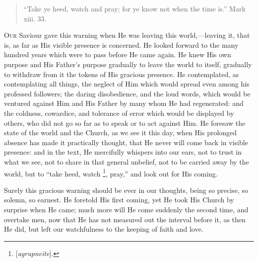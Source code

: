 
\begin{quote}

``Take ye heed, watch and pray; for ye know not when the time
is.'' Mark xiii. 33.

\end{quote}

O\textsc{ur} Saviour gave this warning when He was leaving this world,—leaving
it, that is, as far as His visible presence is concerned. He looked
forward to the many hundred years which were to pass before He came
again. He knew His own purpose and His Father's purpose gradually to
leave the world to itself, gradually to withdraw from it the tokens of
His gracious presence. He contemplated, as contemplating all things,
the neglect of Him which would spread even among his professed
followers; the daring disobedience, and the loud words, which would be
ventured against Him and His Father by many whom He had regenerated:
and the coldness, cowardice, and tolerance of error which would be
displayed by others, who did not go so far as to speak or to act
against Him. He foresaw the state of the world and the Church, as we
see it this day, when His prolonged absence has made it practically
thought, that He never will come back in visible presence: and in the
text, He mercifully whispers into our ears, not to trust in what we
see, not to share in that general unbelief, not to be carried away by
the world, but to ``take heed, watch \footnote{[\emph{agrupneite}].},
pray,'' and look out for His coming.

Surely this gracious warning should be ever in our thoughts, being
so precise, so solemn, so earnest. He foretold His first coming, yet
He took His Church by surprise when He came; much more will He come
suddenly the second time, and overtake men, now that He has not
measured out the interval before it, as then He did, but left our
watchfulness to the keeping of faith and love.

